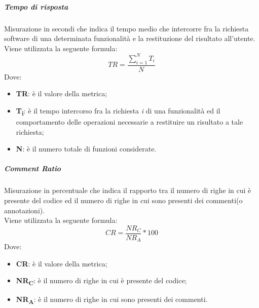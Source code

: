 \subparagraph{Tempo di risposta}\Spazio
Misurazione in secondi che indica il tempo medio che intercorre fra la richiesta software di una determinata funzionalità e la restituzione del risultato all'utente. \\
Viene utilizzata la seguente formula:
$$TR=\frac{\sum\limits_{i=1}^N{T_i}}{N}$$
Dove:
\begin{itemize}
	\item{\textbf{TR}: è il valore della metrica;}
	\item{\textbf{T\textsubscript{i}}: è il tempo intercorso fra la richiesta \emph{i} di una funzionalità ed il comportamento delle operazioni necessarie a restituire un risultato a tale richiesta;}
	\item{\textbf{N}: è il numero totale di funzioni considerate.}
\end{itemize}

\subparagraph{Comment Ratio}\Spazio
Misurazione in percentuale che indica il rapporto tra il numero di righe in cui è presente del codice ed il numero di righe in cui sono presenti dei commenti(o annotazioni). \\
Viene utilizzata la seguente formula:
$$CR=\frac{NR_C}{NR_A}*100$$
Dove:
\begin{itemize}
	\item{\textbf{CR}: è il valore della metrica;}
	\item{\textbf{NR\textsubscript{C}}: è il numero di righe in cui è presente del codice;}
	\item{\textbf{NR\textsubscript{A}}: è il numero di righe in cui sono presenti dei commenti.}
\end{itemize}

\pagebreak
